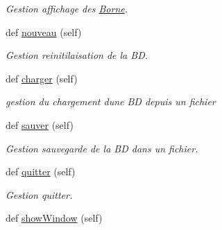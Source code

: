 \begin{DoxyCompactItemize}
\begin{DoxyCompactList}\small\item\em Gestion affichage des \hyperlink{namespacesrc_1_1c_1_1_borne}{Borne}. \end{DoxyCompactList}\item 
\hypertarget{classsrc_1_1c_1_1_main_1_1_main_a17875972aa763b7928d97a61efbc03ab}{}def \hyperlink{classsrc_1_1c_1_1_main_1_1_main_a17875972aa763b7928d97a61efbc03ab}{nouveau} (self)\label{classsrc_1_1c_1_1_main_1_1_main_a17875972aa763b7928d97a61efbc03ab}

\begin{DoxyCompactList}\small\item\em Gestion reinitilaisation de la B\+D. \end{DoxyCompactList}\item 
\hypertarget{classsrc_1_1c_1_1_main_1_1_main_a2917a799ccc066a2644e453af301835c}{}def \hyperlink{classsrc_1_1c_1_1_main_1_1_main_a2917a799ccc066a2644e453af301835c}{charger} (self)\label{classsrc_1_1c_1_1_main_1_1_main_a2917a799ccc066a2644e453af301835c}

\begin{DoxyCompactList}\small\item\em gestion du chargement d\textquotesingle{}une B\+D depuis un fichier \end{DoxyCompactList}\item 
\hypertarget{classsrc_1_1c_1_1_main_1_1_main_a3e0e43f464e805c952e346cfcaa78154}{}def \hyperlink{classsrc_1_1c_1_1_main_1_1_main_a3e0e43f464e805c952e346cfcaa78154}{sauver} (self)\label{classsrc_1_1c_1_1_main_1_1_main_a3e0e43f464e805c952e346cfcaa78154}

\begin{DoxyCompactList}\small\item\em Gestion sauvegarde de la B\+D dans un fichier. \end{DoxyCompactList}\item 
\hypertarget{classsrc_1_1c_1_1_main_1_1_main_a412e5bf7a2eb33bbade30621e8e78ca3}{}def \hyperlink{classsrc_1_1c_1_1_main_1_1_main_a412e5bf7a2eb33bbade30621e8e78ca3}{quitter} (self)\label{classsrc_1_1c_1_1_main_1_1_main_a412e5bf7a2eb33bbade30621e8e78ca3}

\begin{DoxyCompactList}\small\item\em Gestion quitter. \end{DoxyCompactList}\item 
\hypertarget{classsrc_1_1c_1_1_main_1_1_main_ae5e049f9c18df04cbfcfb094bdb08c34}{}def \hyperlink{classsrc_1_1c_1_1_main_1_1_main_ae5e049f9c18df04cbfcfb094bdb08c34}{show\+Window} (self)\label{classsrc_1_1c_1_1_main_1_1_main_ae5e049f9c18df04cbfcfb094bdb08c34}


\end{DoxyCompactItemize}
